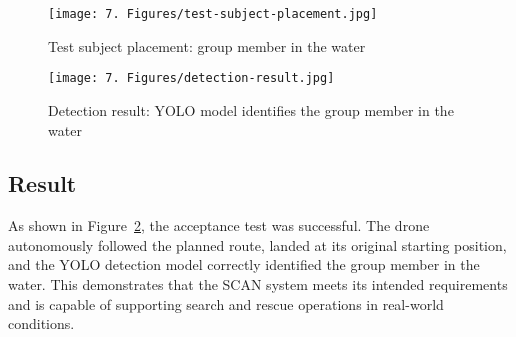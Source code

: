 \begin{figure}[H]
    \centering
    \texttt{[image: 7. Figures/test-subject-placement.jpg]}
    \caption{Test subject placement: group member in the water}
    \label{fig:test-subject-placement}
\end{figure}

\begin{figure}[H]
    \centering
    \texttt{[image: 7. Figures/detection-result.jpg]}
    \caption{Detection result: YOLO model identifies the group member in the water}
    \label{fig:detection-result}
\end{figure}

\subsection{Result}

As shown in Figure~\ref{fig:detection-result}, the acceptance test was successful. The drone autonomously followed the planned route, landed at its original starting position, and the YOLO detection model correctly identified the group member in the water. This demonstrates that the SCAN system meets its intended requirements and is capable of supporting search and rescue operations in real-world conditions.